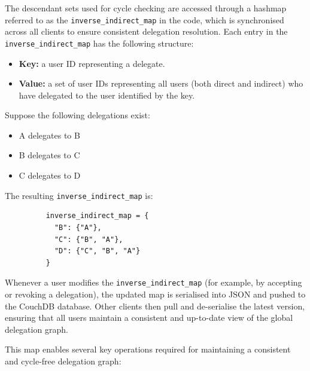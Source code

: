 The descendant sets used for cycle checking are accessed through a hashmap referred to as the \texttt{inverse\_indirect\_map} in the code, which is synchronised across all clients to ensure consistent delegation resolution. Each entry in the \texttt{inverse\_indirect\_map} has the following structure:
\begin{itemize}
  \item \textbf{Key:} a user ID representing a delegate.
  \item \textbf{Value:} a set of user IDs representing all users (both direct and indirect) who have delegated to the user identified by the key.
\end{itemize}

Suppose the following delegations exist:
\begin{itemize}
    \item A delegates to B
    \item B delegates to C
    \item C delegates to D
\end{itemize}

The resulting \texttt{inverse\_indirect\_map} is:
\begin{figure}[H]
  \centering
  \begin{verbatim}
    inverse_indirect_map = {
      "B": {"A"},
      "C": {"B", "A"},
      "D": {"C", "B", "A"}
    }
    \end{verbatim}
  \label{fig:inverse_indirect_map}
\end{figure}

Whenever a user modifies the \texttt{inverse\_indirect\_map} (for example, by accepting or revoking a delegation), the updated map is serialised into JSON and pushed to the CouchDB database. Other clients then pull and de-serialise the latest version, ensuring that all users maintain a consistent and up-to-date view of the global delegation graph.

This map enables several key operations required for maintaining a consistent and cycle-free delegation graph:


